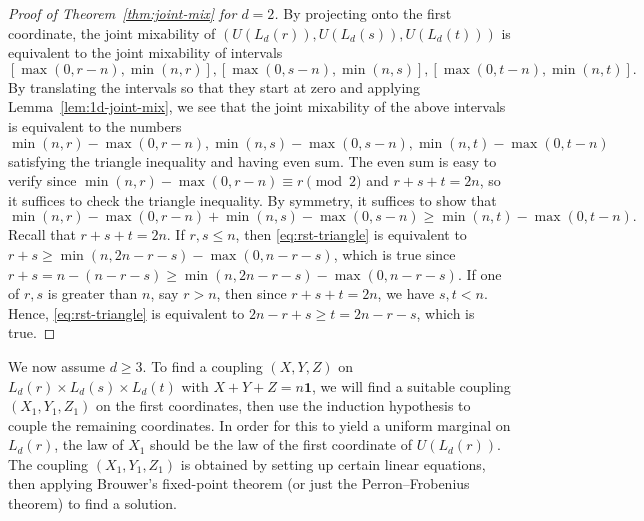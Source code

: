 \documentclass{article}
\newcommand{\ones}{\mathbf{1}}
\theoremstyle{definition}
\begin{document}
\begin{proof}[Proof of Theorem~\ref{thm:joint-mix} for $d=2$]
    By projecting onto the first coordinate, the joint mixability of $(U(L_{d}(r)),U(L_{d}(s)),U(L_{d}(t)))$ is equivalent to the joint mixability of intervals
    \[[\max(0,r-n), \min(n,r)], [\max(0,s-n), \min(n,s)], [\max(0,t-n), \min(n,t)].\]
    By translating the intervals so that they start at zero and applying Lemma~\ref{lem:1d-joint-mix}, we see that the joint mixability of the above intervals is equivalent to the numbers
    \[\min(n,r)-\max(0,r-n), \min(n,s)-\max(0,s-n), \min(n,t)-\max(0,t-n)\]
    satisfying the triangle inequality and having even sum. The even sum is easy to verify since $\min(n,r)-\max(0,r-n)\equiv r\pmod{2}$ and $r+s+t=2n$, so it suffices to check the triangle inequality. By symmetry, it suffices to show that
    \begin{equation} \label{eq:rst-triangle}
        \min(n,r)-\max(0,r-n)+\min(n,s)-\max(0,s-n)\geq \min(n,t)-\max(0,t-n).
    \end{equation}
    Recall that $r+s+t=2n$. If $r,s\leq n$, then \eqref{eq:rst-triangle} is equivalent to $r+s\geq \min(n,2n-r-s)-\max(0,n-r-s)$, which is true since $r+s=n-(n-r-s)\geq \min(n,2n-r-s)-\max(0,n-r-s)$. If one of $r,s$ is greater than $n$, say $r>n$, then since $r+s+t=2n$, we have $s,t<n$. Hence, \eqref{eq:rst-triangle} is equivalent to $2n-r+s\geq t=2n-r-s$, which is true.
\end{proof}

We now assume $d\geq 3$. To find a coupling $(X,Y,Z)$ on $L_{d}(r)\times L_{d}(s)\times L_{d}(t)$ with $X+Y+Z=n\ones$, we will find a suitable coupling $(X_1,Y_1,Z_1)$ on the first coordinates, then use the induction hypothesis to couple the remaining coordinates. In order for this to yield a uniform marginal on $L_{d}(r)$, the law of $X_1$ should be the law of the first coordinate of $U(L_{d}(r))$. The coupling $(X_1,Y_1,Z_1)$ is obtained by setting up certain linear equations, then applying Brouwer's fixed-point theorem (or just the Perron--Frobenius theorem) to find a solution.
\end{document}
